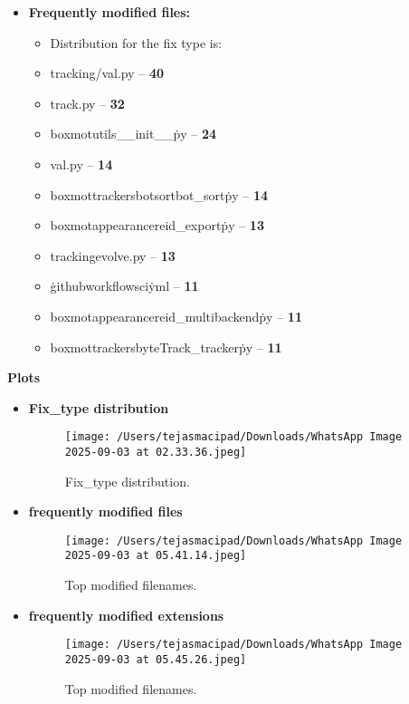 \documentclass[12pt, a4paper]{report}
\newcommand{\sectionbar}[1]{%
  \vspace{0.6\baselineskip}%
  \noindent
  \colorbox{sectionbar}{%
    \parbox{\dimexpr\linewidth-2\fboxsep\relax}{%
      \textbf{\Large\textsf{#1}}%
    }%
  }%
  \vspace{0.6\baselineskip}
}
\begin{document}
\begin{itemize}
\begin{itemize}
            \item \textbf{Frequently modified files:}
            \begin{itemize}
                \item Distribution for the fix type is:
                \item {tracking/val.py} -- \textbf{40}
                \item {track.py} -- \textbf{32}
                \item {boxmot\/utils\/\_\_init\_\_\.py} -- \textbf{24}
                \item {val.py } -- \textbf{14}
                \item {boxmot\/trackers\/botsort\/bot\_sort\.py} -- \textbf{14}
                \item {boxmot\/appearance\/reid\_export\.py} -- \textbf{13}
                \item {tracking\/evolve\(\).py} -- \textbf{13}
                \item {\.github\/workflows\/ci\.yml} -- \textbf{11}
                \item {boxmot\/appearance\/reid\_multibackend\.py} -- \textbf{11}
                \item {boxmot\/trackers\/byteTrack\_tracker\.py} -- \textbf{11}
            \end{itemize}
        \end{itemize}

\end{itemize}

\newpage

\sectionbar{Plots}

\begin{itemize}
    \item \textbf{Fix\_type distribution}
        \begin{figure}[h!]
            \centering
            \texttt{[image: /Users/tejasmacipad/Downloads/WhatsApp Image 2025-09-03 at 02.33.36.jpeg]}
            \caption{Fix\_type distribution.}
            \label{fig:diff-example-5}
        \end{figure}

    \item \textbf{frequently modified files}
        \begin{figure}[h!]
            \centering
            \texttt{[image: /Users/tejasmacipad/Downloads/WhatsApp Image 2025-09-03 at 05.41.14.jpeg]}
            \caption{Top modified filenames.}
            \label{fig:diff-example-6}
        \end{figure}

    \newpage

    \item \textbf{frequently modified extensions}
        \begin{figure}[h!]
            \centering
            \texttt{[image: /Users/tejasmacipad/Downloads/WhatsApp Image 2025-09-03 at 05.45.26.jpeg]}
            \caption{Top modified filenames.}
            \label{fig:diff-example-7}
        \end{figure}

\end{itemize}
\end{document}
